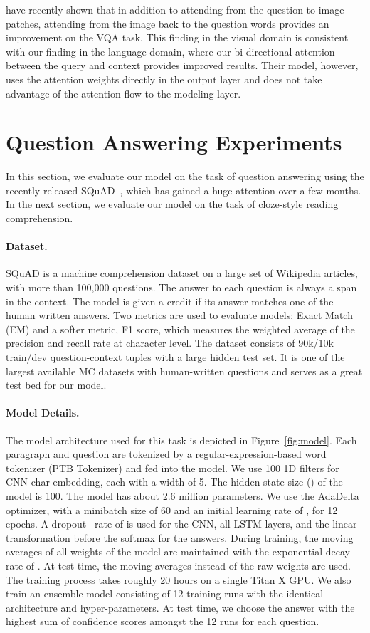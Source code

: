 \documentclass{article} \usepackage{iclr2017_conference,times}
\begin{document}
\citet{lu2016hierarchical} have recently shown that in addition to attending from the question to image patches, attending from the image back to the question words provides an improvement on the VQA task. This finding in the visual domain is consistent with our finding in the language domain, where our bi-directional attention between the query and context provides improved results. 
Their model, however, uses the attention weights directly in the output layer and does not take advantage of the attention flow to the modeling layer. 
 
\section{Question Answering Experiments}\label{sec:squad}
In this section, we evaluate our model on the task of question answering using the recently released SQuAD~\citep{rajpurkar2016squad}, which has gained a huge attention over a few months. In the next section, we evaluate our model on the task of cloze-style reading comprehension. 


\paragraph{Dataset.}
SQuAD is a machine comprehension dataset on a large set of Wikipedia articles, with more than 100,000 questions. The answer to each question is always a span in the context. 
The model is given a credit if its answer matches one of the human written answers.  
Two metrics are used to evaluate models: Exact Match (EM) and a softer metric, F1 score, which measures the weighted average of the precision and recall rate at character level. 
The dataset consists of 90k/10k train/dev question-context tuples with a large hidden test set. 
It is one of the largest available MC datasets with human-written questions and serves as a great test bed for our model.

\paragraph{Model Details.}\label{subsec:squad-details}
The model architecture used for this task is depicted in Figure~\ref{fig:model}. Each paragraph and question are tokenized by a regular-expression-based word tokenizer (PTB Tokenizer) and fed into the model. We use 100 1D filters for CNN char embedding, each with a width of 5. 
The hidden state size () of the model is 100. 
The model has about 2.6 million parameters.
We use the AdaDelta~\citep{adadelta} optimizer, with a minibatch size of 60 and an initial learning rate of , for 12 epochs. 
A dropout~\citep{dropout} rate of  is used for the CNN, all LSTM layers, and the linear transformation before the softmax for the answers. 
During training, the moving averages of all weights of the model are maintained with the exponential decay rate of . 
At test time, the moving averages instead of the raw weights are used.
The training process takes roughly 20 hours on a single Titan X GPU. We also train an ensemble model consisting of 12 training runs with the identical architecture and hyper-parameters. 
At test time, we choose the answer with the highest sum of confidence scores amongst the 12 runs for each question.
\end{document}
